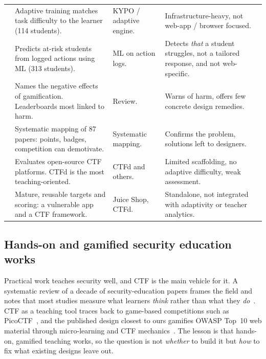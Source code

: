 \begin{small}
\begin{longtable}{@{}p{1.7cm} p{4.5cm} p{2.6cm} p{4.6cm}@{}}
\cite{Vykopal2022smart} & Adaptive training matches task difficulty to the learner (114 students). & KYPO / adaptive engine. & Infrastructure-heavy, not web-app / browser focused. \\

\cite{Svabensky2024detecting} & Predicts at-risk students from logged actions using ML (313 students). & ML on action logs. & Detects \emph{that} a student struggles, not a tailored response, and not web-specific. \\

\cite{Toda2018dark} & Names the negative effects of gamification. Leaderboards most linked to harm. & Review. & Warns of harm, offers few concrete design remedies. \\

\cite{Almeida2023negative} & Systematic mapping of 87 papers: points, badges, competition can demotivate. & Systematic mapping. & Confirms the problem, solutions left to designers. \\

\cite{Karagiannis2020analysis} & Evaluates open-source CTF platforms. CTFd is the most teaching-oriented. & CTFd and others. & Limited scaffolding, no adaptive difficulty, weak assessment. \\

\cite{Owasp_juiceshop,Ctfd_docs} & Mature, reusable targets and scoring: a vulnerable app and a CTF framework. & Juice Shop, CTFd. & Standalone, not integrated with adaptivity or teacher analytics. \\

\end{longtable}
\end{small}

\subsection{Hands-on and gamified security education works}

Practical work teaches security well, and CTF is the main vehicle for it. A
systematic review of a decade of security-education papers frames the field and
notes that most studies measure what learners \emph{think} rather than what they
\emph{do}~\cite{Svabensky2020what}. CTF as a teaching tool traces back to game-based
competitions such as PicoCTF~\cite{Chapman2014picoctf}, and the published design
closest to ours gamifies OWASP Top~10 web material through micro-learning and CTF
mechanics~\cite{Electronics2022teaching}. The lesson is that hands-on, gamified
teaching works, so the question is not \emph{whether} to build it but \emph{how} to
fix what existing designs leave out.

